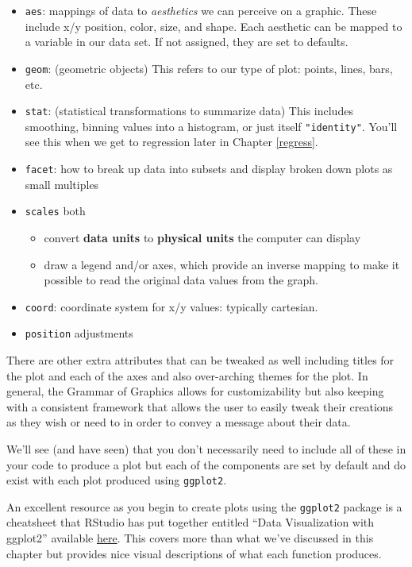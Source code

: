 \documentclass[]{tufte-book}
\providecommand{\tightlist}{%
  \setlength{\itemsep}{0pt}\setlength{\parskip}{0pt}}
\begin{document}
\begin{itemize}
\item
  \texttt{aes}: mappings of data to \emph{aesthetics} we can perceive on
  a graphic. These include x/y position, color, size, and shape. Each
  aesthetic can be mapped to a variable in our data set. If not
  assigned, they are set to defaults.
\item
  \texttt{geom}: (geometric objects) This refers to our type of plot:
  points, lines, bars, etc.
\item
  \texttt{stat}: (statistical transformations to summarize data) This
  includes smoothing, binning values into a histogram, or just itself
  \texttt{"identity"}. You'll see this when we get to regression later
  in Chapter \ref{regress}.
\item
  \texttt{facet}: how to break up data into subsets and display broken
  down plots as small multiples
\item
  \texttt{scales} both

  \begin{itemize}
  \tightlist
  \item
    convert \textbf{data units} to \textbf{physical units} the computer
    can display
  \item
    draw a legend and/or axes, which provide an inverse mapping to make
    it possible to read the original data values from the graph.
  \end{itemize}
\item
  \texttt{coord}: coordinate system for x/y values: typically cartesian.
\item
  \texttt{position} adjustments
\end{itemize}

There are other extra attributes that can be tweaked as well including
titles for the plot and each of the axes and also over-arching themes
for the plot. In general, the Grammar of Graphics allows for
customizability but also keeping with a consistent framework that allows
the user to easily tweak their creations as they wish or need to in
order to convey a message about their data.

We'll see (and have seen) that you don't necessarily need to include all
of these in your code to produce a plot but each of the components are
set by default and do exist with each plot produced using
\texttt{ggplot2}.

An excellent resource as you begin to create plots using the
\texttt{ggplot2} package is a cheatsheet that RStudio has put together
entitled ``Data Visualization with ggplot2'' available
\href{https://www.rstudio.com/wp-content/uploads/2015/12/ggplot2-cheatsheet-2.0.pdf}{here}.
This covers more than what we've discussed in this chapter but provides
nice visual descriptions of what each function produces.
\end{document}
